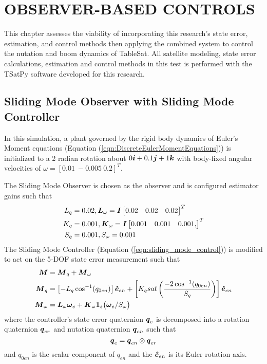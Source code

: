 
\chapter{OBSERVER-BASED CONTROLS}
\label{chap:ObserverBasedControls}

This chapter assesses the viability of incorporating this research's state error, estimation, and control methods then applying the combined system to control the nutation and boom dynamics of TableSat.  All satellite modeling, state error calculations, estimation and control methods in this test is performed with the TSatPy software developed for this research.

\section{Sliding Mode Observer with Sliding Mode Controller}

In this simulation, a plant governed by the rigid body dynamics of Euler's Moment equations (Equation (\ref{eqn:DiscreteEulerMomentEquations})) is initialized to a 2 radian rotation about $0 \boldsymbol{i} +0.1 \boldsymbol{j} +1 \boldsymbol{k}$ with body-fixed angular velocities of $\omega = [0.01 \ -0.005 \ 0.2]^T$.

The Sliding Mode Observer is chosen as the observer and is configured estimator gains such that
\begin{equation}
  \begin{aligned}
    L_q &= 0.02, \boldsymbol{L}_{\omega} = \boldsymbol{I} \begin{bmatrix} 0.02 & 0.02 & 0.02 \end{bmatrix}^T \\
    K_q &= 0.001, \boldsymbol{K}_{\omega} = \boldsymbol{I} \begin{bmatrix} 0.001 & 0.001 & 0.001, \end{bmatrix}^T \\
    S_q &= 0.001, S_{\omega} = 0.001
  \end{aligned}
\end{equation}
The Sliding Mode Controller (Equation (\ref{eqn:sliding_mode_control})) is modified to act on the 5-DOF state error measurement such that
\begin{equation}
  \begin{aligned}
    \boldsymbol{M} &= \boldsymbol{M}_{q} + \boldsymbol{M}_{\omega} \\
    \boldsymbol{M}_{q} &= \left[- L_{q} \cos^{-1} (q_{0en}) \right] \boldsymbol{\hat{e}}_{en} + \left[ K_{q} sat \left( \frac{-2\cos^{-1} (q_{0en})}{S_q} \right) \right] \boldsymbol{\hat{e}}_{en} \\
    \boldsymbol{M}_{\omega} &= \boldsymbol{L}_{\omega} \boldsymbol{\omega}_e + \boldsymbol{K}_{\omega}\boldsymbol{1}_s \big(\boldsymbol{\omega}_e / S_{\omega} \big) \\
  \end{aligned}
\end{equation}
where the controller's state error quaternion $\boldsymbol{q}_e$ is decomposed into a rotation quaternion $\boldsymbol{q}_{er}$ and nutation quaternion  $\boldsymbol{q}_{en}$ such that
\begin{equation}
  \boldsymbol{q}_e = \boldsymbol{q}_{en} \otimes \boldsymbol{q}_{er}
\end{equation}
and $q_{0en}$ is the scalar component of $q_{en}$ and the $\boldsymbol{\hat{e}}_{en}$ is its Euler rotation axis.

